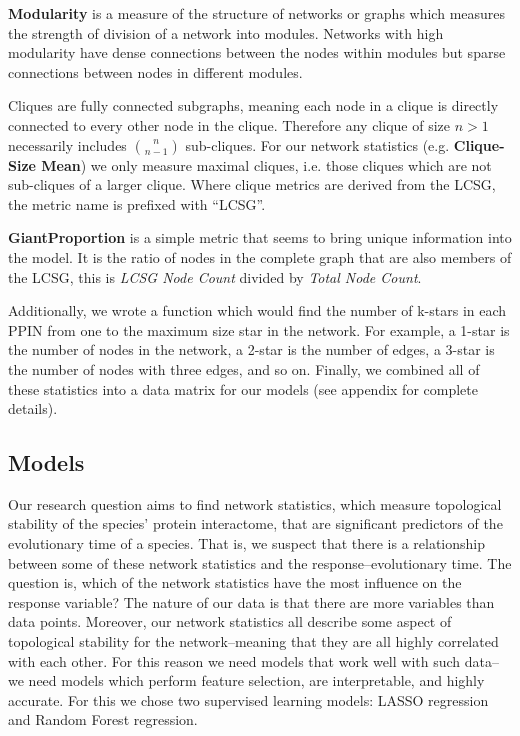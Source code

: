 \documentclass[12pt]{article}
\begin{document}
\textbf{Modularity} is a measure of the structure of networks or graphs which measures the strength of division of a network into modules. Networks with high modularity have dense connections between the nodes within modules but sparse connections between nodes in different modules.

Cliques are fully connected subgraphs, meaning each node in a clique is directly connected to every other node in the clique. Therefore any clique of size $n>1$ necessarily includes ${n \choose n-1}$ sub-cliques. For our network statistics (e.g. \textbf{Clique-Size Mean}) we only measure maximal cliques, i.e. those cliques which are not sub-cliques of a larger clique. Where clique metrics are derived from the LCSG, the metric name is prefixed with ``LCSG''.

\textbf{GiantProportion} is a simple metric that seems to bring unique information into the model. It is the ratio of nodes in the complete graph that are also members of the LCSG, this is \textit{LCSG Node Count} divided by \textit{Total Node Count}.

Additionally, we wrote a function which would find the number of k-stars in each PPIN from one to the maximum size star in the network. For example, a 1-star is the number of nodes in the network, a 2-star is the number of edges, a 3-star is the number of nodes with three edges, and so on. Finally, we combined all of these statistics into a data matrix for our models (see appendix for complete details).

\subsection{Models}
Our research question aims to find network statistics, which measure topological stability of the species’ protein interactome, that are significant predictors of the evolutionary time of a species. That is, we suspect that there is a relationship between some of these network statistics and the response--evolutionary time. The question is, which of the network statistics have the most influence on the response variable? The nature of our data is that there are more variables than data points. Moreover, our network statistics all describe some aspect of topological stability for the network--meaning that they are all highly correlated with each other. For this reason we need models that work well with such data--we need models which perform feature selection, are interpretable, and highly accurate. For this we chose two supervised learning models: LASSO regression and Random Forest regression. 
\end{document}
